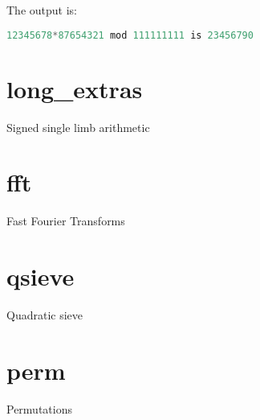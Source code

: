 \documentclass[a4paper,10pt]{book}
\begin{document}
{{The output is:
\begin{lstlisting}[language=c]
12345678*87654321 mod 111111111 is 23456790
\end{lstlisting}




\chapter{long\_extras}
\epigraph{Signed single limb arithmetic}{}




\chapter{fft}
\epigraph{Fast Fourier Transforms}{}




\chapter{qsieve}
\epigraph{Quadratic sieve}{}




\chapter{perm}
\epigraph{Permutations}{}

}}
\end{document}
